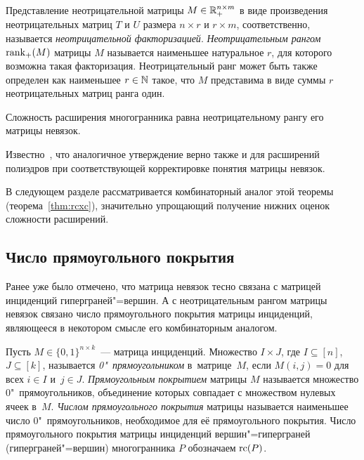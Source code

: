 \begin{definition}\label{def:nonneg}
Представление неотрицательной матрицы $M \in \mathbb{R}_+^{n\times m}$ в виде произведения неотрицательных матриц $T$ и $U$ размера $n\times r$ и $r\times m$, соответственно, называется \emph{неотрицательной факторизацией}.
\emph{Неотрицательным рангом} $\operatorname{rank}_+(M)$ матрицы $M$ называется наименьшее натуральное $r$, для которого возможна такая факторизация.
Неотрицательный ранг может быть также определен как наименьшее $r\in\mathbb{N}$ такое, что $M$ представима в виде суммы $r$ неотрицательных матриц ранга один.
\end{definition}


\begin{theorem}
\label{thm:Yannakakis}
Сложность расширения многогранника равна неотрицательному рангу его матрицы невязок.
\end{theorem}

Известно~\cite{Conforti:2010}, что аналогичное утверждение верно также и для расширений полиэдров при соответствующей корректировке понятия матрицы невязок.

В следующем разделе рассматривается комбинаторный аналог этой теоремы (теорема~\ref{thm:rcxc}), значительно упрощающий получение нижних оценок сложности расширений.

\subsection{Число прямоугольного покрытия}
\label{sec:RectCover}

Ранее уже было отмечено, что матрица невязок тесно связана с матрицей инциденций гиперграней"=вершин.
А с неотрицательным рангом матрицы невязок связано число прямоугольного покрытия матрицы инциденций, являющееся в некотором смысле его комбинаторным аналогом.

\begin{definition}\label{def:rect}
Пусть $M \in \{0,1\}^{n\times k}$~--- матрица инциденций.
Множество $I\times J$, где $I\subseteq [n]$, $J\subseteq [k]$, называется \emph{0"~прямоугольником} в~матрице~$M$, если $M(i,j) = 0$ для всех $i\in I$ и~$j\in J$.
\emph{Прямоугольным покрытием} матрицы $M$ называется множество 0"~прямоугольников, объединение которых 
совпадает с множеством нулевых ячеек в~$M$.
\emph{Числом прямоугольного покрытия} матрицы называется наименьшее число 0"~прямоугольников, необходимое для её прямоугольного покрытия.
Число прямоугольного покрытия матрицы инциденций вершин"=гиперграней (гиперграней"=вершин) многогранника $P$ обозначаем $\operatorname{rc}(P)$.
\end{definition}

